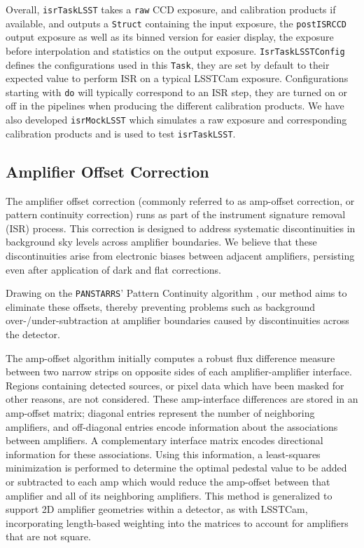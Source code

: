 Overall, \texttt{isrTaskLSST} takes a \texttt{raw} CCD exposure, and calibration products if available, and outputs a \texttt{Struct} containing the input exposure, the \texttt{postISRCCD} output exposure as well as its binned version for easier display, the exposure before interpolation and statistics on the output exposure.
\texttt{IsrTaskLSSTConfig} defines the configurations used in this \texttt{Task}, they are set by default to their expected value to perform ISR on a typical LSSTCam exposure. Configurations starting with \texttt{do} will typically correspond to an ISR step, they are turned on or off in the pipelines when producing the different calibration products.
We have also developed \texttt{isrMockLSST} which simulates a raw exposure and corresponding calibration products and is used to test \texttt{isrTaskLSST}.


\subsection{Amplifier Offset Correction}
\label{sec:isr:ampoffset}
The amplifier offset correction (commonly referred to as amp-offset correction, or pattern continuity correction) runs as part of the instrument signature removal (ISR) process.
This correction is designed to address systematic discontinuities in background sky levels across amplifier boundaries.
We believe that these discontinuities arise from electronic biases between adjacent amplifiers, persisting even after application of dark and flat corrections.

Drawing on the \texttt{PANSTARRS}' Pattern Continuity algorithm \citep{2020ApJS..251....4W}, our method aims to eliminate these offsets, thereby preventing problems such as background over-/under-subtraction at amplifier boundaries caused by discontinuities across the detector.

The amp-offset algorithm initially computes a robust flux difference measure between two narrow strips on opposite sides of each amplifier-amplifier interface.
Regions containing detected sources, or pixel data which have been masked for other reasons, are not considered.
These amp-interface differences are stored in an amp-offset matrix; diagonal entries represent the number of neighboring amplifiers, and off-diagonal entries encode information about the associations between amplifiers.
A complementary interface matrix encodes directional information for these associations.
Using this information, a least-squares minimization is performed to determine the optimal pedestal value to be added or subtracted to each amp which would reduce the amp-offset between that amplifier and all of its neighboring amplifiers.
This method is generalized to support 2D amplifier geometries within a detector, as with LSSTCam, incorporating length-based weighting into the matrices to account for amplifiers that are not square.


